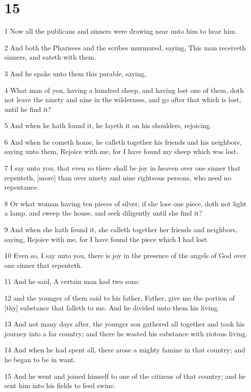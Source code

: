 \chapter{15}

\par 1 Now all the publicans and sinners were drawing near unto him to hear him.
\par 2 And both the Pharisees and the scribes murmured, saying, This man receiveth sinners, and eateth with them.
\par 3 And he spake unto them this parable, saying,
\par 4 What man of you, having a hundred sheep, and having lost one of them, doth not leave the ninety and nine in the wilderness, and go after that which is lost, until he find it?
\par 5 And when he hath found it, he layeth it on his shoulders, rejoicing.
\par 6 And when he cometh home, he calleth together his friends and his neighbors, saying unto them, Rejoice with me, for I have found my sheep which was lost.
\par 7 I say unto you, that even so there shall be joy in heaven over one sinner that repenteth, [more] than over ninety and nine righteous persons, who need no repentance.
\par 8 Or what woman having ten pieces of silver, if she lose one piece, doth not light a lamp, and sweep the house, and seek diligently until she find it?
\par 9 And when she hath found it, she calleth together her friends and neighbors, saying, Rejoice with me, for I have found the piece which I had lost.
\par 10 Even so, I say unto you, there is joy in the presence of the angels of God over one sinner that repenteth.
\par 11 And he said, A certain man had two sons:
\par 12 and the younger of them said to his father, Father, give me the portion of [thy] substance that falleth to me. And he divided unto them his living.
\par 13 And not many days after, the younger son gathered all together and took his journey into a far country; and there he wasted his substance with riotous living.
\par 14 And when he had spent all, there arose a mighty famine in that country; and he began to be in want.
\par 15 And he went and joined himself to one of the citizens of that country; and he sent him into his fields to feed swine.
